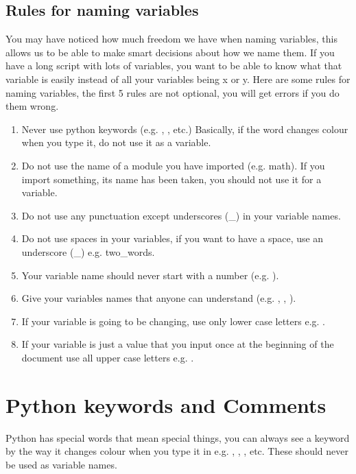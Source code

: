 \subsection{Rules for naming variables}

You may have noticed how much freedom we have when naming variables, this allows us to be able to make smart decisions about how we name them. If you have a long script with lots of variables, you want to be able to know what that variable is easily instead of all your variables being x or y. Here are some rules for naming variables, the first 5 rules are not optional, you will get errors if you do them wrong.

\begin{enumerate}
\item Never use python keywords (e.g. , ,  etc.) Basically, if the word changes colour when you type it, do not use it as a variable.
\item Do not use the name of a module you have imported (e.g. math). If you import something, its name has been taken, you should not use it for a variable.
\item Do not use any punctuation except underscores ({\_}) in your variable names.
\item Do not use spaces in your variables, if you want to have a space, use an underscore ({\_}) e.g. two{\_}words.
\item Your variable name should never start with a number (e.g. ).
\item Give your variables names that anyone can understand (e.g. , , ).
\item If your variable is going to be changing, use only lower case letters e.g. .
\item If your variable is just a value that you input once at the beginning of the document use all upper case letters e.g. .
\end{enumerate}

\section{Python keywords and Comments}

Python has special words that mean special things, you can always see a keyword by the way it changes colour when you type it in e.g. , , ,  etc. These should never be used as variable names.

